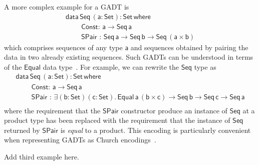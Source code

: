 \documentclass[acmsmall,screen,review,anonymous]{acmart}
\theoremstyle{definition}
\begin{document}
A more complex example for a GADT is
\begin{equation}\label{eq:eq-seq}
\begin{array}{l}
\mathsf{data\, Seq\,(a : Set) : Set\,where}\\
\mathsf{\;\;\;\;\;\;\;\;Const :\, a \to Seq\,a}\\
\mathsf{\;\;\;\;\;\;\;\;SPair\,\, :\, Seq \,a \to Seq\,b \to
  Seq\,(a \times b)}
\end{array}
\end{equation}
which comprises sequences of any type $\mathsf{a}$
and sequences obtained by pairing the data in two already existing sequences.
Such GADTs can be understood in terms of the $\mathsf{Equal}$ data type~\cite{ch03,sp04}.
For example, we can rewrite the $\mathsf{Seq}$ type as
\begin{equation}\label{eq:eq_seq}
\begin{array}{l}
\mathsf{data\, Seq\,(a : Set) : Set\,where}\\
\mathsf{\;\;\;\;\;\;\;\;Const :\, a \to Seq\,a}\\
\mathsf{\;\;\;\;\;\;\;\;SPair\,\, :\, \exists (b : Set) (c : Set).\,Equal\,a\,(b \times c) \to Seq\,b \to Seq\,c \to
  Seq\,a}\\ 
\end{array}
\end{equation}
where the requirement that the $\mathsf{SPair}$ constructor produce an instance of $\mathsf{Seq}$ at a product type has been replaced with the requirement that the instance of $\mathsf{Seq}$ returned by $\mathsf{SPair}$ is \emph{equal} to a product.
This encoding is particularly convenient when representing GADTs as Church encodings~\cite{vw10,atk12}.

Add third example here.



\end{document}
